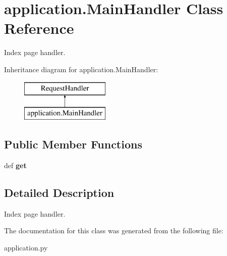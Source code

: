 \hypertarget{classapplication_1_1_main_handler}{\section{application.\-Main\-Handler Class Reference}
\label{classapplication_1_1_main_handler}
}


Index page handler.  


Inheritance diagram for application.\-Main\-Handler\-:\begin{figure}[H]
\begin{center}
\leavevmode
\includegraphics[height=2.000000cm]{classapplication_1_1_main_handler}
\end{center}
\end{figure}
\subsection*{Public Member Functions}
\begin{DoxyCompactItemize}
\item 
\hypertarget{classapplication_1_1_main_handler_ae71c755ef5ff2ae9b026ebdbaf60ea69}{def {\bfseries get}}\label{classapplication_1_1_main_handler_ae71c755ef5ff2ae9b026ebdbaf60ea69}

\end{DoxyCompactItemize}


\subsection{Detailed Description}
Index page handler. 

The documentation for this class was generated from the following file\-:\begin{DoxyCompactItemize}
\item 
application.\-py\end{DoxyCompactItemize}
